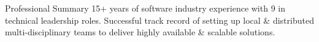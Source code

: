 \documentclass{resume} %
\begin{document}
\vspace{1em}

\begin{rSection}{Professional Summary}
  15+ years of software industry experience with 9 in technical leadership roles. Successful track record of setting up local \& distributed multi-disciplinary teams to deliver highly available \& scalable solutions.


\end{rSection}

\end{document}

